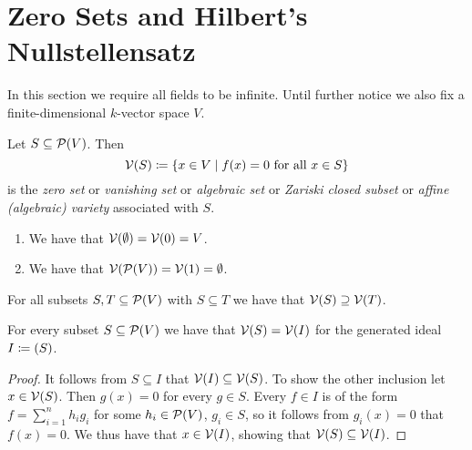 \section{Zero Sets and Hilbert’s Nullstellensatz}


\begin{fluff}
  In this section we require all fields to be infinite.
  Until further notice we also fix a finite-dimensional $k$-vector space $V$.
\end{fluff}


\begin{definition}
  Let $S \subseteq \mathcal{P}(V)$.
  Then
  \[
              \mathcal{V}(S)
    \coloneqq \{
                x \in V
              \mid
                \text{$f(x) = 0$ for all $x \in S$}
              \}
  \]
  is the \emph{zero set} or \emph{vanishing set} or \emph{algebraic set} or \emph{Zariski closed subset} or \emph{affine \textup(algebraic\textup) variety} associated with $S$.
\end{definition}


\begin{example}
  \label{example: examples of algebraic subsets}
  \leavevmode
  \begin{enumerate}
    \item
      We have that $\mathcal{V}(\emptyset) = \mathcal{V}(0) = V$.
    \item
      We have that $\mathcal{V}(\mathcal{P}(V)) = \mathcal{V}(1) = \emptyset$.
  \end{enumerate}
\end{example}




\begin{lemma}
  For all subsets $S, T \subseteq \mathcal{P}(V)$ with $S \subseteq T$ we have that $\mathcal{V}(S) \supseteq \mathcal{V}(T)$.
\end{lemma}


\begin{lemma}
  \label{lemma: vanishing set is the same for generated ideal}
  For every subset $S \subseteq \mathcal{P}(V)$ we have that $\mathcal{V}(S) = \mathcal{V}(I)$ for the generated ideal $I \coloneqq (S)$.
\end{lemma}


\begin{proof}
  It follows from $S \subseteq I$ that $\mathcal{V}(I) \subseteq \mathcal{V}(S)$.
  To show the other inclusion let $x \in \mathcal{V}(S)$.
  Then $g(x) = 0$ for every $g \in S$.
  Every $f \in I$ is of the form $f = \sum_{i=1}^n h_i g_i$ for some $h_i \in \mathcal{P}(V)$, $g_i \in S$, so it follows from $g_i(x) = 0$ that $f(x) = 0$.
  We thus have that $x \in \mathcal{V}(I)$, showing that $\mathcal{V}(S) \subseteq \mathcal{V}(I)$.
\end{proof}


